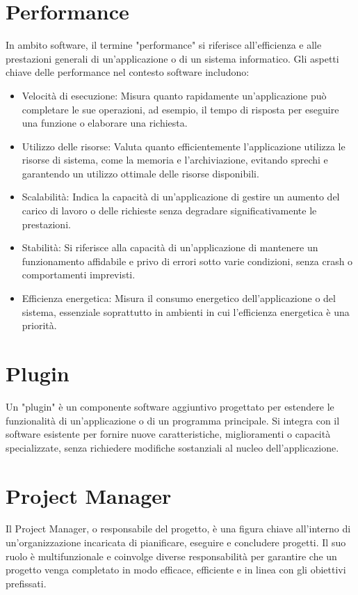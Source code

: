 \documentclass{article}
\begin{document}
\section{Performance}
In ambito software, il termine "performance" si riferisce all'efficienza e alle prestazioni generali di un'applicazione o di un sistema informatico. Gli aspetti chiave delle performance nel contesto software includono:
\begin{itemize}
    \item Velocità di esecuzione: Misura quanto rapidamente un'applicazione può completare le sue operazioni, ad esempio, il tempo di risposta per eseguire una funzione o elaborare una richiesta.
    \item Utilizzo delle risorse: Valuta quanto efficientemente l'applicazione utilizza le risorse di sistema, come la memoria e l'archiviazione, evitando sprechi e garantendo un utilizzo ottimale delle risorse disponibili.
    \item Scalabilità: Indica la capacità di un'applicazione di gestire un aumento del carico di lavoro o delle richieste senza degradare significativamente le prestazioni.
    \item Stabilità: Si riferisce alla capacità di un'applicazione di mantenere un funzionamento affidabile e privo di errori sotto varie condizioni, senza crash o comportamenti imprevisti.
    \item Efficienza energetica: Misura il consumo energetico dell'applicazione o del sistema, essenziale soprattutto in ambienti in cui l'efficienza energetica è una priorità.
\end{itemize}

\section{Plugin}
Un "plugin" è un componente software aggiuntivo progettato per estendere le funzionalità di un'applicazione o di un programma principale. Si integra con il software esistente per fornire nuove caratteristiche, miglioramenti o capacità specializzate, senza richiedere modifiche sostanziali al nucleo dell'applicazione. 

\section{Project Manager}
Il Project Manager, o responsabile del progetto, è una figura chiave all'interno di un'organizzazione incaricata di pianificare, eseguire e concludere progetti. Il suo ruolo è multifunzionale e coinvolge diverse responsabilità per garantire che un progetto venga completato in modo efficace, efficiente e in linea con gli obiettivi prefissati.
\end{document}
